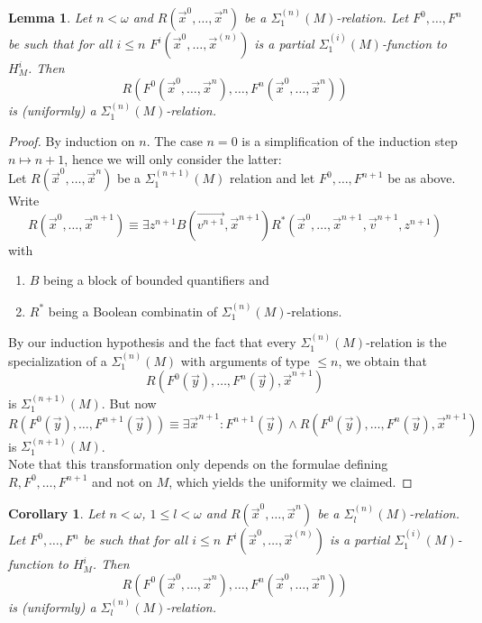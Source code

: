 \documentclass[12pt,a4paper]{article}
\theoremstyle{nicestyle}
\newtheorem{lemma}{Lemma}[subsection]
\newtheorem{corollary}{Corollary}[subsection]
\begin{document}
\begin{lemma}
  Let $n < \omega$ and $R(\vec{x}^{0}, \ldots, \vec{x}^n)$ be a
  $\Sigma^{(n)}_1(M)$-relation. Let $F^0, \ldots, F^{n}$ be such that
  for all $i \le n$ $F^i(\vec{x}^{0}, \ldots, \vec{x}^{(n)})$ is a
  partial $\Sigma^{(i)}_1(M)$-function to $H^i_{M}$. Then
  \[
    R(F^{0}(\vec{x}^{0}, \ldots, \vec{x}^{n}), \ldots,
    F^{n}(\vec{x}^{0}, \ldots, \vec{x}^n))
  \]
  is (uniformly) a $\Sigma^{(n)}_1(M)$-relation.
\end{lemma}

\begin{proof}
  By induction on $n$. The case $n=0$ is a simplification of the induction step
  $n \mapsto n+1$, hence we will only consider the latter: \\

  Let $R(\vec{x}^{0}, \ldots, \vec{x}^n)$ be a $\Sigma^{(n+1)}_1(M)$ relation and let $F^0, \ldots, F^{n+1}$ be as above. Write
  \[
    R(\vec{x}^{0}, \ldots, \vec{x}^{n+1}) \equiv \exists z^{n+1}
    B(\vec{v^{n+1}}, \vec{x}^{n+1}) R^{*}(\vec{x}^{0}, \ldots,
    \vec{x}^{n+1}, \vec{v}^{n+1}, z^{n+1})
  \]
  with
  \begin{enumerate}
  \item $B$ being a block of bounded quantifiers and
  \item $R^{*}$ being a Boolean combinatin of $\Sigma^{(n)}_1(M)$-relations.
  \end{enumerate}
  By our induction hypothesis and the fact that every $\Sigma^{(n)}_1(M)$-relation is the specialization of a $\Sigma^{(n)}_1(M)$ with arguments of type $\le n$, we obtain that
  \[
    R(F^{0}(\vec{y}), \ldots, F^{n}(\vec{y}), \vec{x}^{n+1})
  \]
  is $\Sigma^{(n+1)}_1(M)$. But now
  \[
    R(F^{0}(\vec{y}), \ldots, F^{n+1}(\vec{y})) \equiv \exists
    \vec{x}^{n+1} \colon F^{n+1}(\vec{y}) \wedge R(F^{0}(\vec{y}),
    \ldots, F^{n}(\vec{y}), \vec{x}^{n+1})
  \]
  is $\Sigma^{(n+1)}_1(M)$. \\
  Note that this transformation only depends on the formulae defining
  $R, F^0, \ldots, F^{n+1}$ and not on $M$, which yields the uniformity we
  claimed.
\end{proof}

\begin{corollary} \label{cor:closure under functions}
  Let $n < \omega$, $1 \le l < \omega$ and
  $R(\vec{x}^{0}, \ldots, \vec{x}^n)$ be a
  $\Sigma^{(n)}_l(M)$-relation. Let $F^0, \ldots, F^{n}$ be such that
  for all $i \le n$ $F^i(\vec{x}^{0}, \ldots, \vec{x}^{(n)})$ is a
  partial $\Sigma^{(i)}_1(M)$-function to $H^i_{M}$. Then
  \[
    R(F^{0}(\vec{x}^{0}, \ldots, \vec{x}^{n}), \ldots,
    F^{n}(\vec{x}^{0}, \ldots, \vec{x}^n))
  \]
  is (uniformly) a $\Sigma^{(n)}_l(M)$-relation.
\end{corollary}
\end{document}

